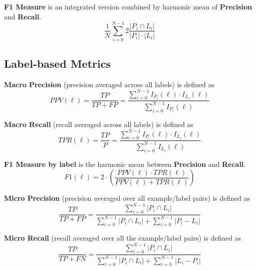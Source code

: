 \textbf{F1 Measure} is an integrated version combined by harmonic mean of \textbf{Precision} and \textbf{Recall}. 
\begin{equation}\label{eq:F1Measure}
\frac{1}{N} \sum_{i=0}^{N-1} 2 \frac{\left|P_i \cap L_i\right|}{\left|P_i\right| \cdot \left|L_i\right|}
\end{equation}

\subsection{Label-based Metrics}

\textbf{Macro Precision} (precision averaged across all labels) is defined as
\begin{equation}\label{eq:MacroPrecision}
PPV(\ell)=\frac{TP}{TP + FP}=
          \frac{\sum_{i=0}^{N-1} I_{P_i}(\ell) \cdot I_{L_i}(\ell)}
          {\sum_{i=0}^{N-1} I_{P_i}(\ell)}
\end{equation}

\textbf{Macro Recall} (recall averaged across all labels) is defined as
\begin{equation}\label{eq:MacroRecall}
TPR(\ell)=\frac{TP}{P}=
          \frac{\sum_{i=0}^{N-1} I_{P_i}(\ell) \cdot I_{L_i}(\ell)}
          {\sum_{i=0}^{N-1} I_{L_i}(\ell)}
\end{equation}

\textbf{F1 Measure by label} is the harmonic mean between \textbf{Precision} and \textbf{Recall}. 
\begin{equation}\label{eq:LabelAccuracy}
F1(\ell) = 2
                            \cdot \left(\frac{PPV(\ell) \cdot TPR(\ell)}
                            {PPV(\ell) + TPR(\ell)}\right)
\end{equation}

\textbf{Micro Precision} (precision averaged over all example/label pairs) is defined as
\begin{equation}\label{eq:MicroPrecision}
\frac{TP}{TP + FP}=\frac{\sum_{i=0}^{N-1} \left|P_i \cap L_i\right|}
          {\sum_{i=0}^{N-1} \left|P_i \cap L_i\right| + \sum_{i=0}^{N-1} \left|P_i - L_i\right|}
\end{equation}

\textbf{Micro Recall} (recall averaged over all the example/label pairs) is defined as
\begin{equation}\label{eq:MicroRecall}
\frac{TP}{TP + FN}=\frac{\sum_{i=0}^{N-1} \left|P_i \cap L_i\right|}
        {\sum_{i=0}^{N-1} \left|P_i \cap L_i\right| + \sum_{i=0}^{N-1} \left|L_i - P_i\right|}
\end{equation}


